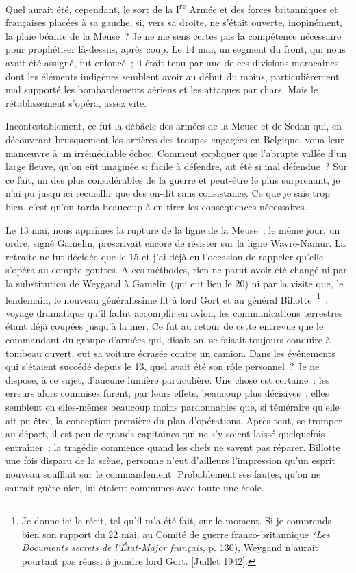 \documentclass[french,twoside]{book} %
\begin{document}
Quel aurait été, cependant, le sort de la I\textsuperscript{re} Armée et des forces britanniques et françaises placées à sa gauche, si, vers sa droite, ne s’était ouverte, inopinément, la plaie béante de la Meuse ? Je ne me sens certes pas la compétence nécessaire pour prophétiser là-dessus, après coup. Le 14 mai, un segment du front, qui nous avait été assigné, fut enfoncé ; il était tenu par une de ces divisions marocaines dont les éléments indigènes semblent avoir au début du moins, particulièrement mal supporté les bombardements aériens et les attaques par chars. Mais le rétablissement s’opéra, assez vite.\par
Incontestablement, ce fut la débâcle des armées de la Meuse et de Sedan qui, en découvrant brusquement les arrières des troupes engagées en Belgique, voua leur manœuvre à un irrémédiable échec. Comment expliquer que l’abrupte vallée d’un large fleuve, qu’on eût imaginée si facile à défendre, ait été si mal défendue ? Sur ce fait, un des plus considérables de la guerre et peut-être le plus surprenant, je n’ai pu jusqu’ici recueillir que des on-dit sans consistance. Ce que je sais trop bien, c’est qu’on tarda beaucoup à en tirer les conséquences nécessaires.\par
Le 13 mai, nous apprîmes la rupture de la ligne de la Meuse ; le même jour, un ordre, signé Gamelin,   prescrivait encore de résister sur la ligne Wavre-Namur. La retraite ne fut décidée que le 15 et j’ai déjà eu l’occasion de rappeler qu’elle s’opéra au compte-gouttes. A ces méthodes, rien ne parut avoir été changé ni par la substitution de Weygand à Gamelin (qui eut lieu le 20) ni par la visite que, le lendemain, le nouveau généralissime fit à lord Gort et au général Billotte \footnote{ Je donne ici le récit, tel qu’il m’a été fait, sur le moment. Si je comprends bien son rapport du 22 mai, au Comité de guerre franco-britannique {\itshape (Les Documents secrets de l’État-Major français}, p. 130), Weygand n’aurait pourtant pas réussi à joindre lord Gort. [Juillet 1942].} : voyage dramatique qu’il fallut accomplir en avion, les communications terrestres étant déjà coupées jusqu’à la mer. Ce fut au retour de cette entrevue que le commandant du groupe d’armées qui, disait-on, se faisait toujours conduire à tombeau ouvert, eut sa voiture écrasée contre un camion. Dans les événements qui s’étaient succédé depuis le 13, quel avait été son rôle personnel ? Je ne dispose, à ce sujet, d’aucune lumière particulière. Une chose est certaine : les erreurs alors commises furent, par leurs effets, beaucoup plus décisives ; elles semblent en elles-mêmes beaucoup moins pardonnables que, si téméraire qu’elle ait pu être, la conception première du plan d’opérations. Après tout, se tromper au départ, il est peu de grands capitaines qui ne s’y soient laissé quelquefois entraîner ; la tragédie commence quand les chefs ne savent pas réparer. Billotte une fois disparu de la scène, personne n’eut d’ailleurs l’impression qu’un esprit nouveau soufflait sur le commandement. Probablement ses fautes, qu’on ne saurait guère nier, lui étaient communes avec toute une école.\par
\end{document}
